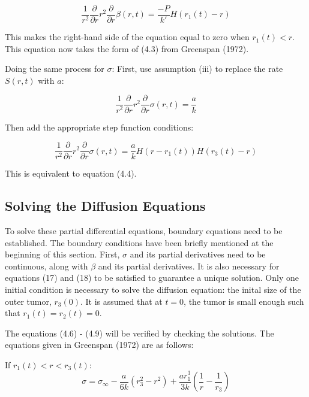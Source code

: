 \documentclass{article}
\begin{document}
\begin{equation}
    \frac{1}{r^2} \frac{\partial}{\partial r} r^2 \frac{\partial}{\partial r} \beta(r, t) = \frac{-P}{k'} H(r_1(t) - r)
\end{equation}

This makes the right-hand side of the equation equal to zero when $r_1(t) < r$. This equation now takes the form of (4.3) from Greenspan (1972).

\vspace*{0.25cm}

Doing the same process for $\sigma$: First, use assumption (iii) to replace the rate $S(r, t)$ with $a$:

\begin{equation}
    \frac{1}{r^2} \frac{\partial}{\partial r} r^2 \frac{\partial}{\partial r} \sigma(r, t) = \frac{a}{k}
\end{equation}

Then add the appropriate step function conditions:

\begin{equation}
    \frac{1}{r^2} \frac{\partial}{\partial r} r^2 \frac{\partial}{\partial r} \sigma(r, t) = \frac{a}{k} H(r - r_1(t)) H(r_3(t) - r)
\end{equation}

This is equivalent to equation (4.4).

\subsection{Solving the Diffusion Equations}

To solve these partial differential equations, boundary equations need to be established. The boundary conditions have been briefly mentioned at the beginning of this
section. First, $\sigma$ and its partial derivatives need to be continuous, along with $\beta$ and its partial derivatives. It is also necessary for equations
(17) and (18) to be satisfied to guarantee a unique solution. Only one initial condition is necessary to solve the diffusion equation: the inital size of the outer
tumor, $r_3(0)$. It is assumed that at $t = 0$, the tumor is small enough such that $r_1(t) = r_2(t) = 0$.

The equations (4.6) - (4.9) will be verified by checking the solutions. The equations given in Greenspan (1972) are as follows:

If $r_1(t) < r < r_3(t)$:
\begin{equation}
    \sigma = \sigma_{\infty} - \frac{a}{6k}(r_3^2 - r^2) + \frac{ar_1^3}{3k} (\frac{1}{r} - \frac{1}{r_3})
\end{equation}
\end{document}
